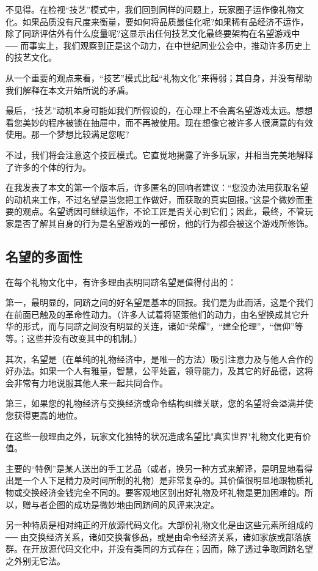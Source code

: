 不见得。在检视“技艺”模式中，我们回到同样的问题上，玩家圈子运作像礼物文化。如果品质没有尺度来衡量，要如何将品质最佳化呢?如果稀有品经济不运作，除了同跻评估外有什么度量呢?这显示出任何技艺文化最终要架构在名望游戏中 ── 而事实上，我们观察到正是这个动力，在中世纪同业公会中，推动许多历史上的技艺文化。

从一个重要的观点来看，“技艺”模式比起“礼物文化”来得弱；其自身，并没有帮助我们解释在本文开始所说的矛盾。

最后，“技艺”动机本身可能如我们所假设的，在心理上不会离名望游戏太远。想想看您美妙的程序被锁在抽屉中，而不再被使用。现在想像它被许多人很满意的有效使用。那一个梦想比较满足您呢?

不过，我们将会注意这个技匠模式。它直觉地揭露了许多玩家，并相当完美地解释了许多的个体的行为。

在我发表了本文的第一个版本后，许多匿名的回响者建议：“您没办法用获取名望的动机来工作，不过名望是当您把工作做好，而获取的真实回报。”这是个微妙而重要的观点。名望诱因可继续运作，不论工匠是否关心到它们；因此，最终，不管玩家是否了解其自身的行为是名望游戏的一部份，他的行为都会被这个游戏所修饰。

\subsection{名望的多面性}
在每个礼物文化中，有许多理由表明同跻名望是值得付出的：

第一，最明显的，同跻之间的好名望是基本的回报。我们是为此而活，这是个我们在前面已触及的革命性动力。（许多人试着将驱策他们的动力，由名望换成其它升华的形式，而与同跻之间没有明显的关连，诸如“荣耀”，“建全伦理”，“信仰”等等。；这些并没有改变其中的机制。）

其次，名望是（在单纯的礼物经济中，是唯一的方法）吸引注意力及与他人合作的好办法。如果一个人有雅量，智慧，公平处置，领导能力，及其它的好品德，这将会非常有力地说服其他人来一起共同合作。

第三，如果您的礼物经济与交换经济或命令结构纠缠关联，您的名望将会溢满并使您获得更高的地位。

在这些一般理由之外，玩家文化独特的状况造成名望比"真实世界"礼物文化更有价值。

主要的“特例”是某人送出的手工艺品（或者，换另一种方式来解译，是明显地看得出是一个人下足精力及时间所制的礼物）是非常复杂的。其价值很明显地跟物质礼物或交换经济金钱完全不同的。要客观地区别出好礼物及坏礼物是更加困难的。所以，赠与者企图的成功是微妙地由同跻间的风评来决定。

另一种特质是相对纯正的开放源代码文化。大部份礼物文化是由这些元素所组成的  ──  由交换经济关系，诸如交换奢侈品，或是由命令经济关系，诸如家族或部落族群。在开放源代码文化中，并没有类同的方式存在；因而，除了透过争取同跻名望之外别无它法。

